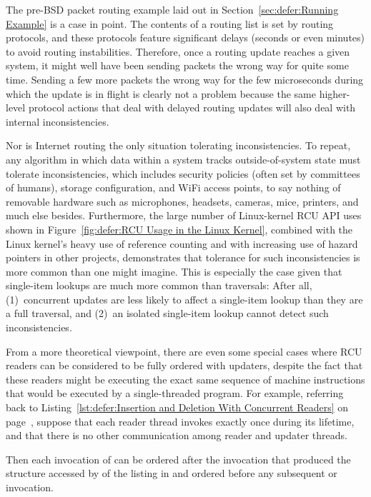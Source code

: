 The pre-BSD packet routing example laid out in
Section~\ref{sec:defer:Running Example}
is a case in point.
The contents of a routing list is set by routing protocols, and these
protocols feature significant delays (seconds or even minutes) to avoid
routing instabilities.
Therefore, once a routing update reaches a given system,
it might well have been sending packets the wrong way for quite some time.
Sending a few more packets the wrong way for the few microseconds during
which the update is in flight is clearly not a problem because the same
higher-level protocol actions that deal with delayed routing updates
will also deal with internal inconsistencies.

Nor is Internet routing the only situation tolerating inconsistencies.
To repeat, any algorithm in which data within a system tracks
outside-of-system state must tolerate inconsistencies, which includes
security policies (often set by committees of humans), storage configuration,
and WiFi access points, to say nothing of removable hardware such as
microphones, headsets, cameras, mice, printers, and much else besides.
Furthermore, the large number of Linux-kernel RCU API uses shown in
Figure~\ref{fig:defer:RCU Usage in the Linux Kernel},
combined with the Linux kernel's heavy use of reference counting
and with increasing use of hazard pointers in other projects, demonstrates
that tolerance for such inconsistencies is more common than one might
imagine.
This is especially the case given that single-item lookups are much more
common than traversals:  After all, (1)~concurrent updates are less likely
to affect a single-item lookup than they are a full traversal, and
(2)~an isolated single-item lookup cannot detect such inconsistencies.

From a more theoretical viewpoint, there are even some special cases where
RCU readers can be considered to be fully ordered with updaters, despite
the fact that these readers might be executing the exact same sequence of
machine instructions that would be executed by a single-threaded program.
For example, referring back to
Listing~\ref{lst:defer:Insertion and Deletion With Concurrent Readers}
on page~\pageref{lst:defer:Insertion and Deletion With Concurrent Readers},
suppose that each reader thread invokes  exactly
once during its lifetime, and that there is no other communication among
reader and updater threads.
\begin{fcvref}
Then each invocation of  can be ordered after the
 invocation that produced the  structure
accessed by  of the listing in 
and ordered before any subsequent
 or  invocation.
\end{fcvref}

